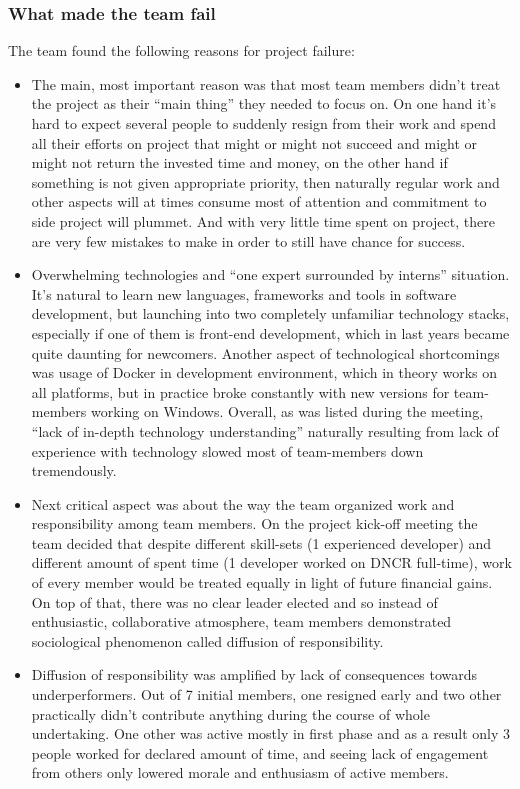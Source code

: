\documentclass{article}
\begin{document}
\subsubsection{What made the team fail}
The team found the following reasons for project failure:
\begin{itemize}
\item The main, most important reason was that most team members didn't treat the project as their ``main thing'' they needed to focus on. On one hand it's hard to expect several people to suddenly resign from their work and spend all their efforts on project that might or might not succeed and might or might not return the invested time and money, on the other hand if something is not given appropriate priority, then naturally regular work and other aspects will at times consume most of attention and commitment to side project will plummet. And with very little time spent on project, there are very few mistakes to make in order to still have chance for success.
\item Overwhelming technologies and ``one expert surrounded by interns'' situation. It's natural to learn new languages, frameworks and tools in software development, but launching into two completely unfamiliar technology stacks, especially if one of them is front-end development, which in last years became quite daunting for newcomers. Another aspect of technological shortcomings was usage of Docker in development environment, which in theory works on all platforms, but in practice broke constantly with new versions for team-members working on Windows. Overall, as was listed during the meeting, ``lack of in-depth technology understanding'' naturally resulting from lack of experience with technology slowed most of team-members down tremendously.
\item Next critical aspect was about the way the team organized work and responsibility among team members. On the project kick-off meeting the team decided that despite different skill-sets (1 experienced developer) and different amount of spent time (1 developer worked on DNCR full-time), work of every member would be treated equally in light of future financial gains. On top of that, there was no clear leader elected and so instead of enthusiastic, collaborative atmosphere, team members demonstrated sociological phenomenon called diffusion of responsibility.
\item Diffusion of responsibility was amplified by lack of consequences towards underperformers. Out of 7 initial members, one resigned early and two other practically didn't contribute anything during the course of whole undertaking. One other was active mostly in first phase and as a result only 3 people worked for declared amount of time, and seeing lack of engagement from others only lowered morale and enthusiasm of active members. 

\end{itemize}
\end{document}
